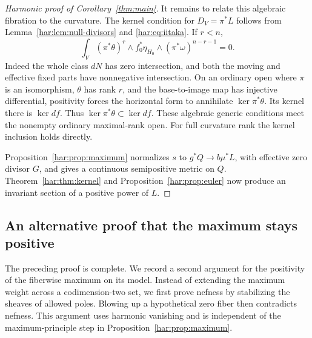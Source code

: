 \begin{proof}[Harmonic proof of Corollary~\ref{thm:main}]
It remains to relate this algebraic fibration to the curvature. The
kernel condition for \(D_V=\pi^*L\) follows from
Lemma~\ref{har:lem:null-divisors} and \eqref{har:eq:iitaka}. If \(r<n\),
\[
 \int_V (\pi^*\theta)^r\wedge f_0^*\eta_{H_0}
                       \wedge(\pi^*\omega)^{n-r-1}=0.
\]
Indeed the whole class \(dN\) has zero intersection, and both the
moving and effective fixed parts have nonnegative intersection. On
an ordinary open where \(\pi\) is an isomorphism, \(\theta\) has rank
\(r\), and the base-to-image map has injective differential, positivity
forces the horizontal form to annihilate \(\ker\pi^*\theta\). Its
kernel there is \(\ker df\). Thus
\(\ker\pi^*\theta\subset\ker df\). These algebraic generic conditions
meet the nonempty ordinary maximal-rank open. For full curvature rank
the kernel inclusion holds directly.

Proposition~\ref{har:prop:maximum} normalizes \(s\) to
\(g^*Q\to b\mu^*L\), with effective zero divisor \(G\), and gives a
continuous semipositive metric on \(Q\). Theorem~\ref{har:thm:kernel}
and Proposition~\ref{har:prop:euler} now produce an invariant section
of a positive power of \(L\).

\end{proof}

\subsection{An alternative proof that the maximum stays positive}

The preceding proof is complete. We record a second argument for the
positivity of the fiberwise maximum on its model. Instead of extending
the maximum weight across a codimension-two set, we first prove
nefness by stabilizing the sheaves of allowed poles. Blowing up a
hypothetical zero fiber then contradicts nefness. This argument uses
harmonic vanishing and is independent of the maximum-principle step
in Proposition~\ref{har:prop:maximum}.

